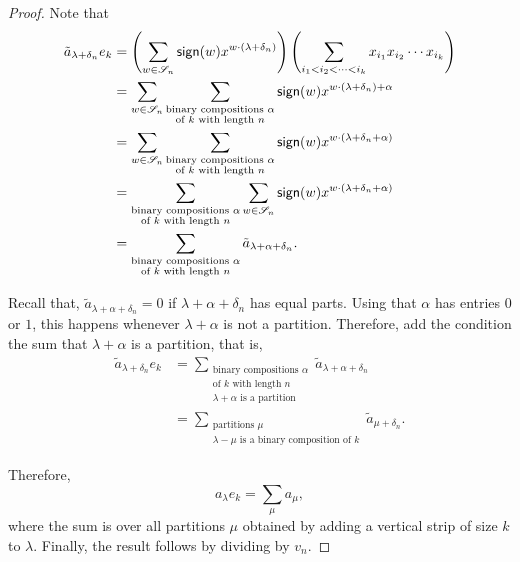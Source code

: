 \begin{proof}
    Note that
    \begin{align}
        \tilde{a}_{\lambda + \delta_n} e_k
        &=
        \left(
            \sum_{w \in \mathscr{S}_{n}} \operatorname{\mathsf{sign}}(w) x^{w \cdot (\lambda + \delta_n)} 
        \right) 
        \left(
            \sum_{i_1 < i_2 < \cdots < i_k} x_{i_1} x_{i_2} \cdots x_{i_k}
        \right) \\
        &=
        \sum_{w \in \mathscr{S}_{n}}
        \sum_{\substack{\text{binary compositions } \alpha \\ \text{of } k \text{ with length } n}}
        \operatorname{\mathsf{sign}}(w) x^{w \cdot (\lambda + \delta_n) + \alpha} \\
        &=
        \sum_{w \in \mathscr{S}_{n}}
        \sum_{\substack{\text{binary compositions } \alpha \\ \text{of } k \text{ with length } n}}
        \operatorname{\mathsf{sign}}(w) x^{w \cdot (\lambda + \delta_n + \alpha)} \\
        &=
        \sum_{\substack{\text{binary compositions } \alpha \\ \text{of } k \text{ with length } n}}
        \sum_{w \in \mathscr{S}_{n}}
        \operatorname{\mathsf{sign}}(w) x^{w \cdot (\lambda + \delta_n + \alpha)} \\
        &=
        \sum_{\substack{\text{binary compositions } \alpha \\ \text{of } k \text{ with length } n}}
        \tilde{a}_{\lambda + \alpha + \delta_n}.
    \end{align}

    Recall that, \(\tilde{a}_{\lambda + \alpha + \delta_n} = 0\) if \(\lambda + \alpha + \delta_n\) has equal parts.
    Using that \(\alpha\) has entries \(0\) or \(1\), this happens whenever \(\lambda + \alpha\) is not a partition.
    Therefore, add the condition the sum that \(\lambda + \alpha\) is a partition, that is,
    \begin{align}
        \tilde{a}_{\lambda + \delta_n} e_k
        &= \sum_{\substack{\text{binary compositions } \alpha \\ \text{of } k \text{ with length } n \\ \lambda + \alpha \text{ is a partition}}}
        \tilde{a}_{\lambda + \alpha + \delta_n} \\
        &= \sum_{\substack{\text{partitions } \mu \\ \lambda - \mu \text{ is a binary composition of } k}}
        \tilde{a}_{\mu + \delta_n}.
    \end{align}

    Therefore,
    \begin{equation}
        a_\lambda e_k = \sum_{\mu} a_{\mu},
    \end{equation}
    where the sum is over all partitions \(\mu\) obtained by adding a vertical strip of size \(k\) to \(\lambda\).
    Finally, the result follows by dividing by \(v_n\).
\end{proof}

